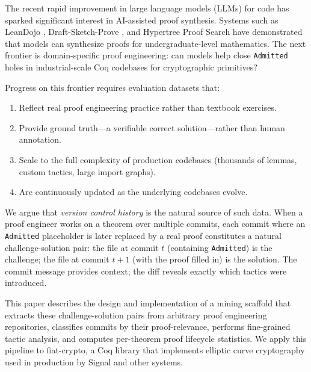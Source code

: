 \documentclass[11pt]{article}
\begin{document}
The recent rapid improvement in large language models (LLMs) for code has sparked significant interest in AI-assisted proof synthesis. Systems such as LeanDojo \citep{yang2023leandojo}, Draft-Sketch-Prove \citep{jiang2022draft}, and Hypertree Proof Search \citep{lample2022hypertree} have demonstrated that models can synthesize proofs for undergraduate-level mathematics. The next frontier is domain-specific proof engineering: can models help close \texttt{Admitted} holes in industrial-scale Coq codebases for cryptographic primitives?

Progress on this frontier requires evaluation datasets that:
\begin{enumerate}
  \item Reflect real proof engineering practice rather than textbook exercises.
  \item Provide ground truth---a verifiable correct solution---rather than human annotation.
  \item Scale to the full complexity of production codebases (thousands of lemmas, custom tactics, large import graphs).
  \item Are continuously updated as the underlying codebases evolve.
\end{enumerate}

We argue that \textit{version control history} is the natural source of such data. When a proof engineer works on a theorem over multiple commits, each commit where an \texttt{Admitted} placeholder is later replaced by a real proof constitutes a natural challenge-solution pair: the file at commit $t$ (containing \texttt{Admitted}) is the challenge; the file at commit $t+1$ (with the proof filled in) is the solution. The commit message provides context; the diff reveals exactly which tactics were introduced.

This paper describes the design and implementation of a mining scaffold that extracts these challenge-solution pairs from arbitrary proof engineering repositories, classifies commits by their proof-relevance, performs fine-grained tactic analysis, and computes per-theorem proof lifecycle statistics. We apply this pipeline to fiat-crypto, a Coq library that implements elliptic curve cryptography used in production by Signal and other systems.
\end{document}
